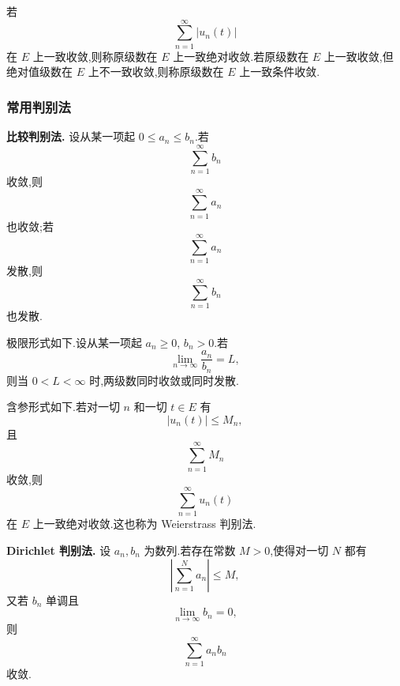 若
\begin{equation*}
	\sum_{n=1}^{\infty}|u_n(t)|
\end{equation*}
在 $E$ 上一致收敛,则称原级数在 $E$ 上一致绝对收敛.若原级数在 $E$ 上一致收敛,但绝对值级数在 $E$ 上不一致收敛,则称原级数在 $E$ 上一致条件收敛.

\subsubsection{常用判别法}

\textbf{比较判别法.}
设从某一项起 $0\leq a_n\leq b_n$.若
\begin{equation*}
	\sum_{n=1}^{\infty}b_n
\end{equation*}
收敛,则
\begin{equation*}
	\sum_{n=1}^{\infty}a_n
\end{equation*}
也收敛;若
\begin{equation*}
	\sum_{n=1}^{\infty}a_n
\end{equation*}
发散,则
\begin{equation*}
	\sum_{n=1}^{\infty}b_n
\end{equation*}
也发散.

极限形式如下.设从某一项起 $a_n\geq0$, $b_n>0$.若
\begin{equation*}
	\lim_{n\to\infty}\frac{a_n}{b_n}=L,
\end{equation*}
则当 $0<L<\infty$ 时,两级数同时收敛或同时发散.

含参形式如下.若对一切 $n$ 和一切 $t\in E$ 有
\begin{equation*}
	|u_n(t)|\leq M_n,
\end{equation*}
且
\begin{equation*}
	\sum_{n=1}^{\infty}M_n
\end{equation*}
收敛,则
\begin{equation*}
	\sum_{n=1}^{\infty}u_n(t)
\end{equation*}
在 $E$ 上一致绝对收敛.这也称为 Weierstrass 判别法.

\textbf{Dirichlet 判别法.}
设 $a_n,b_n$ 为数列.若存在常数 $M>0$,使得对一切 $N$ 都有
\begin{equation*}
	\left|\sum_{n=1}^N a_n\right|\leq M,
\end{equation*}
又若 $b_n$ 单调且
\begin{equation*}
	\lim_{n\to\infty}b_n=0,
\end{equation*}
则
\begin{equation*}
	\sum_{n=1}^{\infty}a_nb_n
\end{equation*}
收敛.

